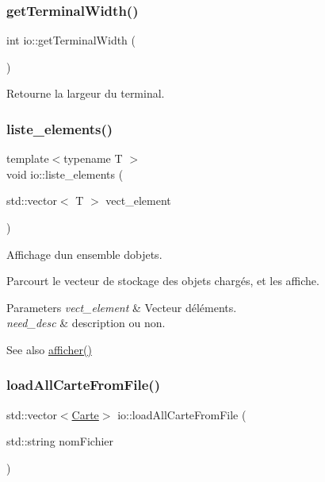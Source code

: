 \subsubsection{\texorpdfstring{get\+Terminal\+Width()}{getTerminalWidth()}}
{\footnotesize\ttfamily int io\+::get\+Terminal\+Width (\begin{DoxyParamCaption}{ }\end{DoxyParamCaption})}



Retourne la largeur du terminal. 

\mbox{\label{namespaceio_acf5693654c155fd094993bf20ac39343}} 
\subsubsection{\texorpdfstring{liste\+\_\+elements()}{liste\_elements()}}
{\footnotesize\ttfamily template$<$typename T $>$ \\
void io\+::liste\+\_\+elements (\begin{DoxyParamCaption}\item[{std\+::vector$<$ T $>$}]{vect\+\_\+element }\end{DoxyParamCaption})}



Affichage d\textquotesingle{}un ensemble d\textquotesingle{}objets. 

Parcourt le vecteur de stockage des objets chargés, et les affiche. 
\begin{DoxyParams}{Parameters}
{\em vect\+\_\+element} & Vecteur d\textquotesingle{}éléments. \\
\hline
{\em need\+\_\+desc} & description ou non. \\
\hline
\end{DoxyParams}
\begin{DoxySeeAlso}{See also}
\hyperlink{namespaceio_ac5222293c3d12f7982a8df7ead04ba0b}{afficher()} 
\end{DoxySeeAlso}
\mbox{\label{namespaceio_abb49308ca24862cc2b64c8c15949af44}} 
\subsubsection{\texorpdfstring{load\+All\+Carte\+From\+File()}{loadAllCarteFromFile()}}
{\footnotesize\ttfamily std\+::vector$<$\hyperlink{class_carte}{Carte}$>$ io\+::load\+All\+Carte\+From\+File (\begin{DoxyParamCaption}\item[{std\+::string}]{nom\+Fichier }\end{DoxyParamCaption})}



